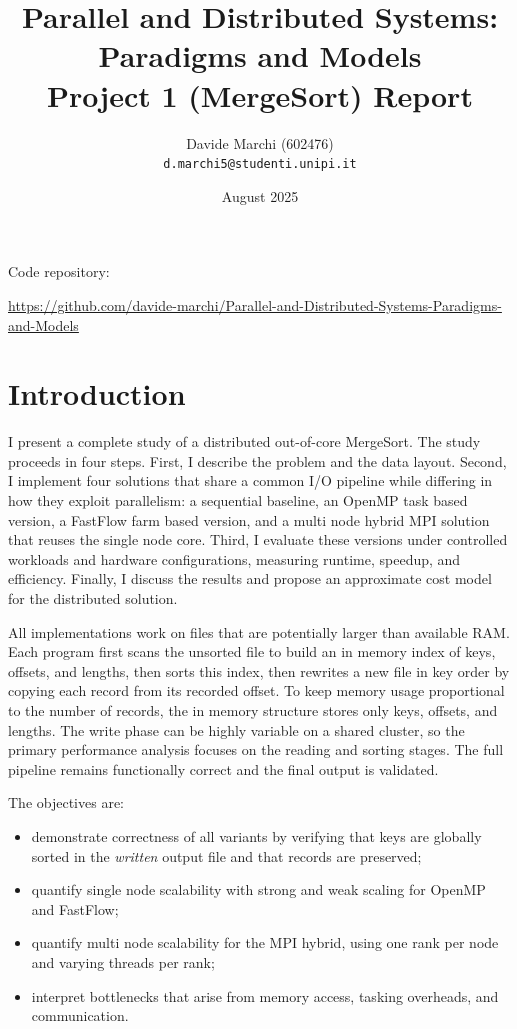 \documentclass[12pt]{article}
\title{Parallel and Distributed Systems: Paradigms and Models\\
Project 1 (MergeSort) Report}
\author{Davide Marchi (602476)\\\texttt{d.marchi5@studenti.unipi.it}}
\date{August 2025}
\begin{document}

\maketitle
\begin{center}
Code repository:

\url{https://github.com/davide-marchi/Parallel-and-Distributed-Systems-Paradigms-and-Models}
\end{center}
\clearpage

\tableofcontents
\clearpage

\setcounter{page}{1}


\section{Introduction}
I present a complete study of a distributed out-of-core MergeSort. The study proceeds in four steps. First, I describe the problem and the data layout. Second, I implement four solutions that share a common I/O pipeline while differing in how they exploit parallelism: a sequential baseline, an OpenMP task based version, a FastFlow farm based version, and a multi node hybrid MPI solution that reuses the single node core. Third, I evaluate these versions under controlled workloads and hardware configurations, measuring runtime, speedup, and efficiency. Finally, I discuss the results and propose an approximate cost model for the distributed solution.

All implementations work on files that are potentially larger than available RAM. Each program first scans the unsorted file to build an in memory index of keys, offsets, and lengths, then sorts this index, then rewrites a new file in key order by copying each record from its recorded offset. To keep memory usage proportional to the number of records, the in memory structure stores only keys, offsets, and lengths. The write phase can be highly variable on a shared cluster, so the primary performance analysis focuses on the reading and sorting stages. The full pipeline remains functionally correct and the final output is validated.

The objectives are:
\begin{itemize}
  \item demonstrate correctness of all variants by verifying that keys are globally sorted in the \emph{written} output file and that records are preserved;
  \item quantify single node scalability with strong and weak scaling for OpenMP and FastFlow;
  \item quantify multi node scalability for the MPI hybrid, using one rank per node and varying threads per rank;
  \item interpret bottlenecks that arise from memory access, tasking overheads, and communication.
\end{itemize}
\end{document}
